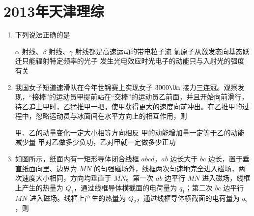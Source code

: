 \documentclass[\gkver]{gaokaozhenti}
\begin{document}
\chapter{2013年天津理综}

\begin{enumerate}
\item
下列说法正确的是

{$\alpha$ 射线、$\beta$ 射线、$\gamma$ 射线都是高速运动的带电粒子流}
{氢原子从激发态向基态跃迁只能辐射特定频率的光子}
{发生光电效应时光电子的动能只与入射光的强度有关}


\item
我国女子短道速滑队在今年世锦赛上实现女子 $3000\Um$ 接力三连冠。观察发现，“接棒”的运动员甲提前站在“交棒”的运动员乙前面，并且开始向前滑行，待乙追上甲时，乙猛推甲一把，使甲获得更大的速度向前冲出。在乙推甲的过程中，忽略运动员与冰面间在水平方向上的相互作用，则


{甲、乙的动量变化一定大小相等方向相反}
{甲的动能增加量一定等于乙的动能减少量}
{甲对乙做多少负功，乙对甲就一定做多少正功}


\item
如图所示，纸面内有一矩形导体闭合线框 $abcd$，$ab$ 边长大于 $bc$ 边长，置于垂直纸面向里、边界为 $MN$ 的匀强磁场外，线框两次匀速地完全进入磁场，两次速度大小相同，方向均垂直于 $MN$。第一次 $ab$ 边平行 $MN$ 进入磁场，线框上产生的热量为 $Q_{1}$，通过线框导体横截面的电荷量为 $q_{1}$；第二次 $bc$ 边平行 $MN$ 进入磁场。线框上产生的热量为 $Q_{2}$，通过线框导体横截面的电荷量为 $q_{2}$，则


\end{enumerate}
\end{document}
